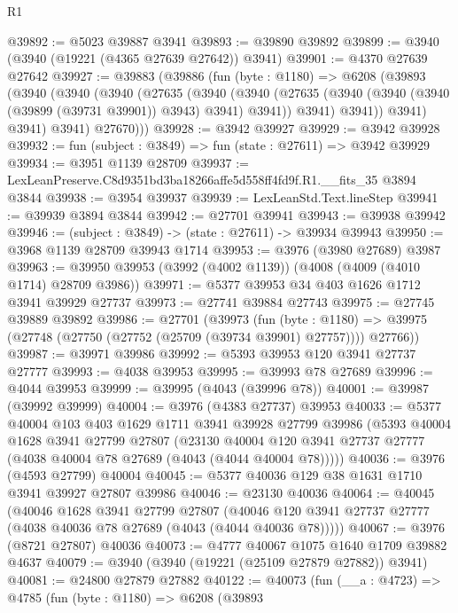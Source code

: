 \begin{lexlean}{R1}
\begin{coremodule}
@39892 := @5023 @39887 @3941
@39893 := @39890 @39892
@39899 := @3940 (@3940 (@19221 (@4365 @27639 @27642)) @3941)
@39901 := @4370 @27639 @27642
@39927 := @39883
    (@39886
      (fun (byte : @1180) =>
      @6208
        (@39893
          (@3940
            (@3940
              (@3940
                (@27635
                  (@3940
                    (@3940
                      (@27635 (@3940 (@3940 (@3940 (@39899 (@39731 @39901)) @3943) @3941) @3941))
                      @3941)
                    @3941))
                @3941)
              @3941)
            @3941)
          @27670)))
@39928 := @3942 @39927
@39929 := @3942 @39928
@39932 := fun (subject : @3849) => fun (state : @27611) => @3942 @39929
@39934 := @3951 @1139 @28709
@39937 := LexLeanPreserve.C8d9351bd3ba18266affe5d558ff4fd9f.R1.__fits_35 @3894 @3844
@39938 := @3954 @39937
@39939 := LexLeanStd.Text.lineStep
@39941 := @39939 @3894 @3844
@39942 := @27701 @39941
@39943 := @39938 @39942
@39946 := (subject : @3849) -> (state : @27611) -> @39934 @39943
@39950 := @3968 @1139 @28709 @39943 @1714
@39953 := @3976 (@3980 @27689) @3987
@39963 := @39950 @39953 (@3992 (@4002 @1139)) (@4008 (@4009 (@4010 @1714) @28709 @3986))
@39971 := @5377 @39953 @34 @403 @1626 @1712 @3941 @39929 @27737
@39973 := @27741 @39884 @27743
@39975 := @27745 @39889 @39892
@39986 := @27701
    (@39973
      (fun (byte : @1180) =>
      @39975 (@27748 (@27750 (@27752 (@25709 (@39734 @39901) @27757)))) @27766))
@39987 := @39971 @39986
@39992 := @5393 @39953 @120 @3941 @27737 @27777
@39993 := @4038 @39953
@39995 := @39993 @78 @27689
@39996 := @4044 @39953
@39999 := @39995 (@4043 (@39996 @78))
@40001 := @39987 (@39992 @39999)
@40004 := @3976 (@4383 @27737) @39953
@40033 := @5377
    @40004
    @103
    @403
    @1629
    @1711
    @3941
    @39928
    @27799
    @39986
    (@5393
      @40004
      @1628
      @3941
      @27799
      @27807
      (@23130 @40004 @120 @3941 @27737 @27777 (@4038 @40004 @78 @27689 (@4043 (@4044 @40004 @78)))))
@40036 := @3976 (@4593 @27799) @40004
@40045 := @5377 @40036 @129 @38 @1631 @1710 @3941 @39927 @27807 @39986
@40046 := @23130 @40036
@40064 := @40045
    (@40046
      @1628
      @3941
      @27799
      @27807
      (@40046 @120 @3941 @27737 @27777 (@4038 @40036 @78 @27689 (@4043 (@4044 @40036 @78)))))
@40067 := @3976 (@8721 @27807) @40036
@40073 := @4777 @40067 @1075 @1640 @1709 @39882 @4637
@40079 := @3940 (@3940 (@19221 (@25109 @27879 @27882)) @3941)
@40081 := @24800 @27879 @27882
@40122 := @40073
    (fun (__a : @4723) =>
    @4785
      (fun (byte : @1180) =>
      @6208
        (@39893

\end{coremodule}
\end{lexlean}
